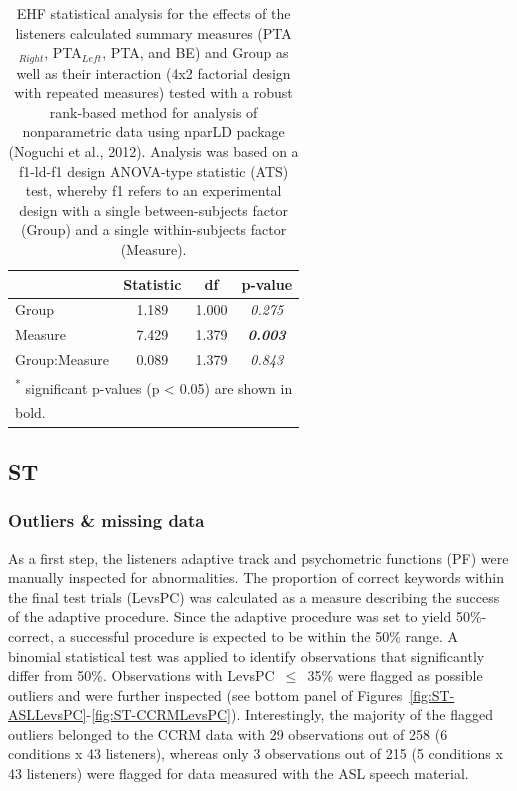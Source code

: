\documentclass[a4paper, twoside]{templates/ociamthesis}
\begin{document}
\begin{table}

\caption{\label{tab:EHF-PTATabnparLD}EHF statistical analysis for the effects of the listeners calculated summary measures (PTA$_{Right}$, PTA$_{Left}$, PTA, and BE) and Group as well as their interaction (4x2 factorial design with repeated measures) tested with a robust rank-based method for analysis of nonparametric data using nparLD package (Noguchi et al., 2012). Analysis was based on a f1-ld-f1 design ANOVA-type statistic (ATS) test, whereby f1 refers to an experimental design with a single between-subjects factor (Group) and a single within-subjects factor (Measure).}
\centering
\begin{tabular}[t]{lcc>{}c}
\toprule
  & Statistic & df & p-value\\
\midrule
Group & 1.189 & 1.000 & \em{0.275}\\
Measure & 7.429 & 1.379 & \em{\textbf{0.003}}\\
Group:Measure & 0.089 & 1.379 & \em{0.843}\\
\bottomrule
\multicolumn{4}{l}{\textsuperscript{*} significant p-values (p < 0.05) are shown in}\\
\multicolumn{4}{l}{bold.}\\
\end{tabular}
\end{table}

\hypertarget{st}{%
\subsection{ST}\label{st}}

\hypertarget{outliers-missing-data}{%
\subsubsection*{Outliers \& missing data}\label{outliers-missing-data}}

As a first step, the listeners adaptive track and psychometric functions (PF) were manually inspected for abnormalities. The proportion of correct keywords within the final test trials (LevsPC) was calculated as a measure describing the success of the adaptive procedure. Since the adaptive procedure was set to yield 50\%-correct, a successful procedure is expected to be within the 50\% range. A binomial statistical test was applied to identify observations that significantly differ from 50\%. Observations with LevsPC~\(\leq\)~35\% were flagged as possible outliers and were further inspected (see bottom panel of Figures~\ref{fig:ST-ASLLevsPC}-\ref{fig:ST-CCRMLevsPC}). Interestingly, the majority of the flagged outliers belonged to the CCRM data with 29 observations out of 258 (6 conditions x 43 listeners), whereas only 3 observations out of 215 (5 conditions x 43 listeners) were flagged for data measured with the ASL speech material.
\end{document}
